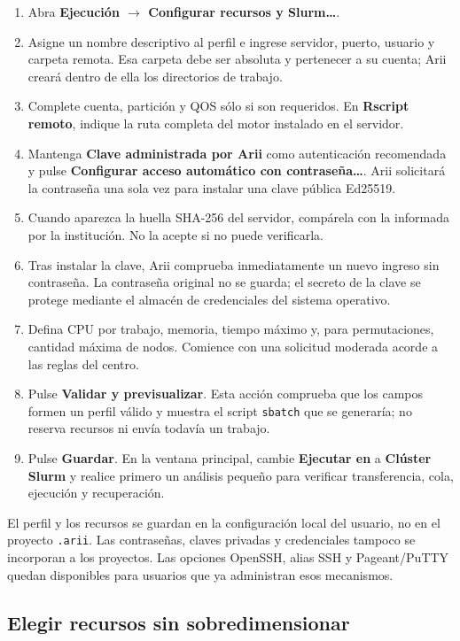 \documentclass[11pt,a4paper,openany]{report}
\newcommand{\menu}[1]{\textbf{#1}}
\newcommand{\code}[1]{\texttt{#1}}
\begin{document}
\begin{enumerate}
  \item Abra \menu{Ejecución \texorpdfstring{$\rightarrow$}{ > } Configurar
  recursos y Slurm…}.
  \item Asigne un nombre descriptivo al perfil e ingrese servidor, puerto,
  usuario y carpeta remota. Esa carpeta debe ser absoluta y pertenecer a su
  cuenta; Arii creará dentro de ella los directorios de trabajo.
  \item Complete cuenta, partición y QOS sólo si son requeridos. En
  \menu{Rscript remoto}, indique la ruta completa del motor instalado en el
  servidor.
  \item Mantenga \menu{Clave administrada por Arii} como autenticación recomendada
  y pulse \menu{Configurar acceso automático con contraseña…}. Arii solicitará la
  contraseña una sola vez para instalar una clave pública Ed25519.
  \item Cuando aparezca la huella SHA-256 del servidor, compárela con la
  informada por la institución. No la acepte si no puede verificarla.
  \item Tras instalar la clave, Arii comprueba inmediatamente un nuevo ingreso
  sin contraseña. La contraseña original no se guarda; el secreto de la clave se
  protege mediante el almacén de credenciales del sistema operativo.
  \item Defina CPU por trabajo, memoria, tiempo máximo y, para permutaciones,
  cantidad máxima de nodos. Comience con una solicitud moderada acorde a las
  reglas del centro.
  \item Pulse \menu{Validar y previsualizar}. Esta acción comprueba que los
  campos formen un perfil válido y muestra el script \code{sbatch} que se
  generaría; no reserva recursos ni envía todavía un trabajo.
  \item Pulse \menu{Guardar}. En la ventana principal, cambie
  \menu{Ejecutar en} a \menu{Clúster Slurm} y realice primero un análisis
  pequeño para verificar transferencia, cola, ejecución y recuperación.
\end{enumerate}

El perfil y los recursos se guardan en la configuración local del usuario, no en
el proyecto \code{.arii}. Las contraseñas, claves privadas y credenciales tampoco
se incorporan a los proyectos. Las opciones OpenSSH, alias SSH y Pageant/PuTTY
quedan disponibles para usuarios que ya administran esos mecanismos.

\subsection{Elegir recursos sin sobredimensionar}
\end{document}
